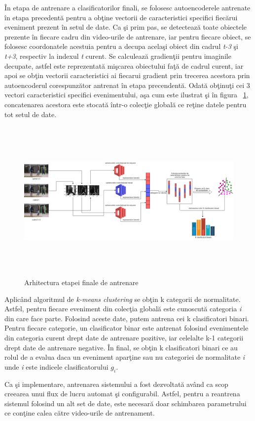 \documentclass[a4paper,12pt]{report}
\begin{document}
\par
În etapa de antrenare a clasificatorilor finali, se folosesc autoencoderele antrenate în etapa precedentă pentru a obţine vectorii de caracteristici specifici fiecărui eveniment prezent în setul de date. Ca şi prim pas, se detectează toate obiectele prezente în fiecare cadru din video-urile  de antrenare, iar pentru fiecare obiect, se folosesc coordonatele acestuia pentru a decupa acelaşi obiect din cadrul \emph{t-3} şi \emph{t+3}, respectiv la indexul \emph{t} curent. Se calculează gradienţii pentru imaginile decupate, astfel este reprezentată mişcarea obiectului faţă de cadrul curent, iar apoi se obţin vectorii caracteristici ai fiecarui gradient prin trecerea acestora prin autoencoderul corespunzător antrenat în etapa precendentă. Odată obţinuţi cei 3 vectori caracteristici specifici evenimentului, aşa cum este ilustrat şi în figura ~\ref{fig:stage2_architecture}, concatenarea acestora este stocată într-o colecţie globală ce reţine datele pentru tot setul de date.
\begin{figure}[h]
\begin{center}
        \includegraphics[width=1\textwidth,height=8cm]{images/training_stage2_architecture}
			 \caption{Arhitectura etapei finale de antrenare}
			 \label{fig:stage2_architecture}
\end{center}
\end{figure}
\par
Aplicând algoritmul de \emph{k-means clustering} se obţin k categorii de normalitate. Astfel, pentru fiecare eveniment din colecţia globală este cunoscută categoria \emph{i} din care face parte. Folosind aceste date, putem antrena cei k clasificatori binari. Pentru fiecare categorie, un clasificator binar este antrenat folosind evenimentele din categoria curent drept date de antrenare pozitive, iar celelalte k-1 categorii drept date de antrenare negative. În final, se obţin k clasificatori binari ce au rolul de a evalua daca un eveniment aparţine sau nu categoriei de normalitate \emph{i} unde \emph{i} este indicele clasificatorului 
\emph{\(g_{i}\)}. 
\par Ca şi implementare, antrenarea sistemului a fost dezvoltată având ca scop creearea unui flux de lucru automat şi configurabil. Astfel, pentru a reantrena sistemul folosind un alt set de date, este necesară doar schimbarea parametrului ce conţine calea către video-urile de antrenament.
\end{document}
